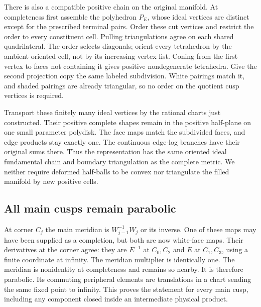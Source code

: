 There is also a compatible positive chain on the original manifold.
At completeness first assemble the polyhedron $P_E$, whose
ideal vertices are distinct except for the prescribed terminal pairs.
Order these cut vertices and restrict the order to every constituent
cell. Pulling triangulations agree on each shared quadrilateral.
The order selects diagonals; orient every tetrahedron by the ambient
oriented cell, not by its increasing vertex list. Coning from the first
vertex to faces not containing it gives positive nondegenerate
tetrahedra. Give the second projection copy the same labeled
subdivision. White pairings match it, and shaded pairings are already
triangular, so no order on the quotient cusp vertices is required.

Transport these finitely many ideal vertices by the rational charts
just constructed.
Their positive complete shapes remain in the positive half-plane
on one small parameter polydisk. The face maps match the subdivided
faces, and edge products stay exactly one. The continuous edge-log
branches have their original sums there. Thus the representation has
the same oriented ideal fundamental chain and boundary triangulation
as the complete metric. We neither require deformed half-balls to
be convex nor triangulate the filled manifold by new positive cells.

\subsection{All main cusps remain parabolic}
At corner $C_j$ the main meridian is
$W_{j-1}^{-1}W_j$ or its inverse. One of these maps may have been
supplied as a completion, but both are now white-face maps.
Their derivatives at the corner agree: they are $E^{-1}$ at
$C_0,C_2$ and $E$ at $C_1,C_3$, using a finite coordinate at
infinity. The meridian multiplier is identically one. The
meridian is nonidentity at completeness and remains so nearby.
It is therefore parabolic. Its commuting peripheral elements
are translations in a chart sending the same fixed point to infinity. This proves the
statement for every main cusp, including any component closed
inside an intermediate physical product.

